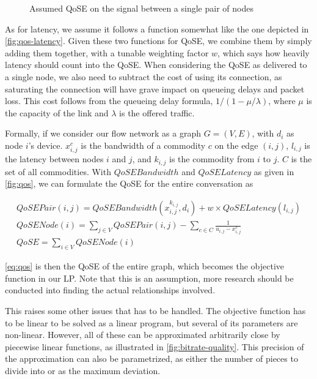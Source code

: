 \begin{figure}
\begin{subfigure}{.48\textwidth}
        \label{fig:qos-bandwidth}
    \end{subfigure}
    \caption{Assumed QoSE on the signal between a single pair of nodes}
    \label{fig:qos}
\end{figure}

As for latency, we assume it follows a function somewhat like the one depicted in \autoref{fig:qos-latency}. Given these two functions for QoSE, we combine them by simply adding them together, with a tunable weighting factor $w$, which says how heavily latency should count into the QoSE. When considering the QoSE as delivered to a single node, we also need to subtract the cost of using its connection, as saturating the connection will have grave impact on queueing delays and packet loss. This cost follows from the queueing delay formula, $1/(1 - \mu/\lambda)$, where $\mu$ is the capacity of the link and $\lambda$ is the offered traffic.

Formally, if we consider our flow network as a graph $G = (V, E)$, with $d_i$ as node $i$'s device. $x^c_{i,j}$ is the bandwidth of a commodity $c$ on the edge $(i,j)$, $l_{i,j}$ is the latency between nodes $i$ and $j$, and $k_{i,j}$ is the commodity from $i$ to $j$. $C$ is the set of all commodities. With $QoSEBandwidth$ and $QoSELatency$ as given in \autoref{fig:qos}, we can formulate the QoSE for the entire conversation as

\begin{gather}\label{eq:qos-pair}
    QoSEPair(i, j) = QoSEBandwidth(x_{i, j}^{k_{i, j}}, d_i) + w \times QoSELatency(l_{i,j}) \\
    QoSENode(i) = \sum_{j \in V} QoSEPair(i, j) - \sum_{c \in C} \frac{1}{u_{i,j} - x_{i,j}^{c}} \\
    QoSE = \sum_{i \in V} QoSENode(i) \label{eq:qos}
\end{gather}

\autoref{eq:qos} is then the QoSE of the entire graph, which becomes the objective function in our LP. Note that this is an assumption, more research should be conducted into finding the actual relationships involved.

This raises some other issues that has to be handled. The objective function has to be linear to be solved as a linear program, but several of its parameters are non-linear. However, all of these can be approximated arbitrarily close by piecewise linear functions, as illustrated in \autoref{fig:bitrate-quality}. This precision of the approximation can also be parametrized, as either the number of pieces to divide into or as the maximum deviation.

